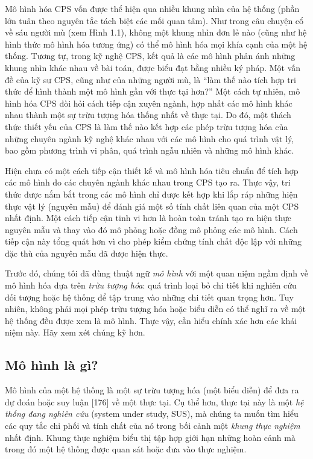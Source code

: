Mô hình hóa CPS vốn được thể hiện qua nhiều khung nhìn của hệ thống (phần lớn tuân theo nguyên tắc tách biệt các mối quan tâm). Như trong câu chuyện cổ về sáu người mù (xem Hình 1.1), không một khung nhìn đơn lẻ nào (cũng như hệ hình thức mô hình hóa tương ứng) có thể mô hình hóa mọi khía cạnh của một hệ thống. Tương tự, trong kỹ nghệ CPS, kết quả là các mô hình phản ánh những khung nhìn khác nhau về bài toán, được biểu đạt bằng nhiều ký pháp. Một vấn đề của kỹ sư CPS, cũng như của những người mù, là ``làm thế nào tích hợp tri thức để hình thành một mô hình gần với thực tại hơn?'' Một cách tự nhiên, mô hình hóa CPS đòi hỏi cách tiếp cận xuyên ngành, hợp nhất các mô hình khác nhau thành một sự trừu tượng hóa thống nhất về thực tại. Do đó, một thách thức thiết yếu của CPS là làm thế nào
kết hợp các phép trừu tượng hóa của những chuyên ngành kỹ nghệ khác nhau với các mô hình cho quá trình vật lý, bao gồm phương trình vi phân, quá trình ngẫu nhiên và những mô hình khác.


Hiện chưa có một cách tiếp cận thiết kế và mô hình hóa tiêu chuẩn để tích hợp các mô hình do các chuyên ngành khác nhau trong CPS tạo ra. Thực vậy, tri thức được nắm bắt trong các mô hình chỉ được kết hợp khi lắp ráp những hiện thực vật lý (nguyên mẫu) để đánh giá một số tính chất liên quan của một CPS nhất định. Một cách tiếp cận tinh vi hơn là hoàn toàn tránh tạo ra hiện thực nguyên mẫu và thay vào đó mô phỏng hoặc đồng mô phỏng các mô hình. Cách tiếp cận này tổng quát hơn vì cho phép kiểm chứng tính chất độc lập với những đặc thù của nguyên mẫu đã được hiện thực.

Trước đó, chúng tôi đã dùng thuật ngữ \emph{mô hình} với một quan niệm ngầm định về mô hình hóa dựa trên \emph{trừu tượng hóa}: quá trình loại bỏ chi tiết khi nghiên cứu đối tượng hoặc hệ thống để tập trung vào những chi tiết quan trọng hơn. Tuy nhiên, không phải mọi phép trừu tượng hóa hoặc biểu diễn có thể nghĩ ra về một hệ thống đều được xem là mô hình. Thực vậy, cần hiểu chính xác hơn các khái niệm này. Hãy xem xét chúng kỹ hơn.

\subsection{Mô hình là gì?}
Mô hình của một hệ thống là một sự trừu tượng hóa (một biểu diễn) để đưa ra dự đoán hoặc suy luận [176] về một thực tại. Cụ thể hơn, thực tại này là một \emph{hệ thống đang nghiên cứu} (system under study, SUS), mà chúng ta muốn tìm hiểu các quy tắc chi phối và tính chất của nó trong bối cảnh một \emph{khung thực nghiệm} nhất định. Khung thực nghiệm biểu thị tập hợp giới hạn những hoàn cảnh mà trong đó một hệ thống được quan sát hoặc đưa vào thực nghiệm.

